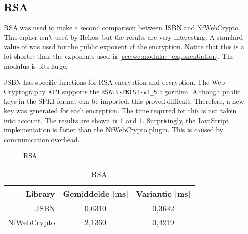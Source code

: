 \subsection{RSA}

RSA was used to make a second comparison between JSBN and NfWebCrypto. This cipher isn't used by Helios, but the results are very interesting. A standard value of  was used for the public exponent of the encryption. Notice that this is a lot shorter than the exponents used in \ref{sec:wc:modular_exponentiation}. The modulus is  bits large.

\par JSBN has specific functions for RSA encryption and decryption. The Web Cryptography API supports the \texttt{RSAES-PKCS1-v1\_5} algorithm.\cite{rfc3447} Although public keys in the SPKI format can be imported, this proved difficult. Therefore, a new key was generated for each encryption. The time required for this is not taken into account. The results are shown in \ref{fig:wc:rsa} and \ref{tab:wc:rsa}. Surprisingly, the JavaScript implementation is faster than the NfWebCrypto plugin. This is caused by communication overhead.

\begin{figure}
  \caption{RSA}
  \label{fig:wc:rsa}
\end{figure}

\begin{table}
  \begin{center}
    \begin{tabular}{r | c c}
      Library & Gemiddelde [ms] & Variantie [ms] \\ \hline
      JSBN & 0,6310 & 0,3632  \\
      NfWebCrypto & 2,1360 & 0,4219
    \end{tabular}
    \caption{RSA}
    \label{tab:wc:rsa}
  \end{center}
\end{table}
